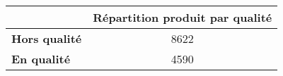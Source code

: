 \begin{tabular}{lc}
\toprule
{} &  Répartition produit par qualité \\
\midrule
\textbf{Hors qualité} &                             8622 \\
\textbf{En qualité  } &                             4590 \\
\bottomrule
\end{tabular}
